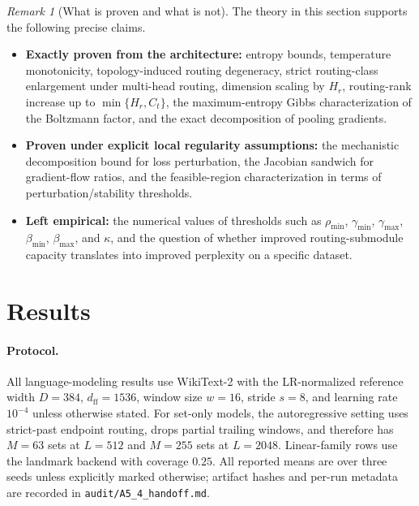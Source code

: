 \documentclass{article}
\theoremstyle{plain}
\theoremstyle{definition}
\theoremstyle{remark}
\newtheorem{remark}[theorem]{Remark}
\begin{document}
\begin{remark}[What is proven and what is not]
\label{rem:what-is-proven}
The theory in this section supports the following precise claims.

\begin{itemize}
    \item \textbf{Exactly proven from the architecture:}
    entropy bounds, temperature monotonicity, topology-induced routing degeneracy, strict routing-class enlargement under multi-head routing, dimension scaling by $H_r$, routing-rank increase up to $\min\{H_r,C_{t}\}$, the maximum-entropy Gibbs characterization of the Boltzmann factor, and the exact decomposition of pooling gradients.

    \item \textbf{Proven under explicit local regularity assumptions:}
    the mechanistic decomposition bound for loss perturbation, the Jacobian sandwich for gradient-flow ratios, and the feasible-region characterization in terms of perturbation/stability thresholds.

    \item \textbf{Left empirical:}
    the numerical values of thresholds such as $\rho_{\min}$, $\gamma_{\min}$, $\gamma_{\max}$, $\beta_{\min}$, $\beta_{\max}$, and $\kappa$, and the question of whether improved routing-submodule capacity translates into improved perplexity on a specific dataset.
\end{itemize}
\end{remark}



\section{Results}
\label{sec:results}

\paragraph{Protocol.}
All language-modeling results use WikiText-2 with the LR-normalized reference
width $D=384$, $d_{\mathrm{ff}}=1536$, window size $w=16$, stride $s=8$,
and learning rate $10^{-4}$ unless otherwise stated.  For set-only models,
the autoregressive setting uses strict-past endpoint routing, drops partial
trailing windows, and therefore has $M=63$ sets at $L=512$ and $M=255$ sets at
$L=2048$.  Linear-family rows use the landmark backend with coverage $0.25$.
All reported means are over three seeds unless explicitly marked otherwise;
artifact hashes and per-run metadata are recorded in
\texttt{audit/A5\_4\_handoff.md}.
\end{document}
